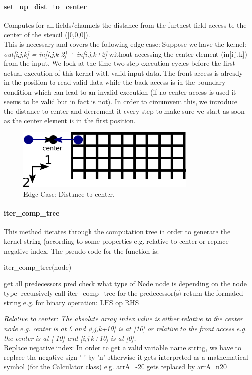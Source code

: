 \paragraph{set\_up\_dist\_to\_center}
Computes for all fields/channels the distance from the furthest field access to the center of the stencil ([0,0,0]). \\ 
This is necessary and covers the following edge case: Suppose we have the kernel: \textit{out[i,j,k] = in[i,j,k-2] + in[i,j,k+2]} without accessing the center element (in[i,j,k]) from the input. We look at the time two step execution cycles before the first actual execution of this kernel with valid input data. The front access is already in the position to read valid data while the back access is in the boundary condition which can lead to an invalid execution (if no center access is used it seems to be valid but in fact is not). In order to circumvent this, we introduce the distance-to-center and decrement it every step to make sure we start as soon as the center element is in the first position.  
\begin{figure}[h]
	\centering
	\includegraphics[height=8em]{drawings/software-dist-to-center.png}
	\caption{Edge Case: Distance to center.}
	\label{fig:software-dist-to-center}
\end{figure}


\paragraph{iter\_comp\_tree}
This method iterates through the computation tree in order to generate the kernel string (according to some properties e.g. relative to center or replace negative index. The pseudo code for the function is:
\begin{algorithm}
	\caption{iter\_comp\_tree(node)}
	\begin{algorithmic}
		\STATE get all predecessors pred
		\STATE check what type of Node node is
		\STATE depending on the node type, recursively call iter\_comp\_tree for the predecessor(s)
		\STATE return the formated string e.g. for binary operation: LHS op RHS
	\end{algorithmic}
\end{algorithm}
\textit{Relative to center: The absolute array index value is either relative to the center node e.g. center is at 0 and [i,j,k+10] is at [10] or relative to the front access e.g. the center is at [-10] and [i,j,k+10] is at [0].}
\\
Replace negative index: In order to get a valid variable name string, we have to replace the negative sign '-' by 'n' otherwise it gets interpreted as a mathematical symbol (for the Calculator class) e.g. arrA\_-20 gets replaced by arrA\_n20


